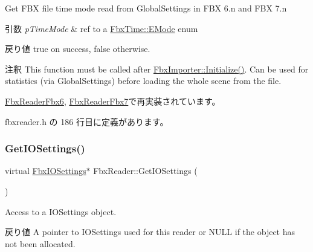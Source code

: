Get F\+BX file time mode read from Global\+Settings in F\+BX 6.\+n and F\+BX 7.\+n 
\begin{DoxyParams}{引数}
{\em p\+Time\+Mode} & ref to a \hyperlink{class_fbx_time_acc529b00a0e8d4c3da3702449ca93031}{Fbx\+Time\+::\+E\+Mode} enum \\
\hline
\end{DoxyParams}
\begin{DoxyReturn}{戻り値}
{\ttfamily true} on success, {\ttfamily false} otherwise. 
\end{DoxyReturn}
\begin{DoxyRemark}{注釈}
This function must be called after \hyperlink{class_fbx_importer_a70528a9ca1ff737bda9696a2073acd13}{Fbx\+Importer\+::\+Initialize()}. Can be used for statistics (via Global\+Settings) before loading the whole scene from the file. 
\end{DoxyRemark}


\hyperlink{class_fbx_reader_fbx6_ad4ae4c4949d316491f937a0ff75c6ed7}{Fbx\+Reader\+Fbx6}, \hyperlink{class_fbx_reader_fbx7_a4aac7f6892348dd1f8fe5129cbfc2cc1}{Fbx\+Reader\+Fbx7}で再実装されています。



 fbxreader.\+h の 186 行目に定義があります。

\mbox{\label{class_fbx_reader_a27bef92675a5f95f18dfe105a0c06d8b}} 
\subsubsection{\texorpdfstring{Get\+I\+O\+Settings()}{GetIOSettings()}}
{\footnotesize\ttfamily virtual \hyperlink{class_fbx_i_o_settings}{Fbx\+I\+O\+Settings}$\ast$ Fbx\+Reader\+::\+Get\+I\+O\+Settings (\begin{DoxyParamCaption}{ }\end{DoxyParamCaption})\hspace{0.3cm}{\ttfamily [virtual]}}

Access to a I\+O\+Settings object. \begin{DoxyReturn}{戻り値}
A pointer to I\+O\+Settings used for this reader or N\+U\+LL if the object has not been allocated. 
\end{DoxyReturn}
\mbox{\label{class_fbx_reader_acea3c118db490378c9aed17512396932}} 
